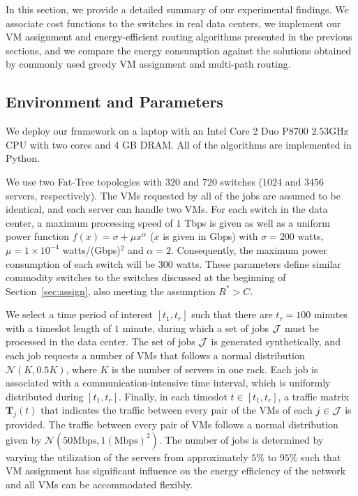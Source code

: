 \documentclass[journal,single-space,two column,twoside,10pt]{IEEEtran}
\begin{document}
In this section, we provide a detailed summary of our experimental findings. We associate cost functions to the switches in real data centers, we implement our VM assignment and \textcolor{black}{energy-efficient} routing algorithms presented in the previous sections, and we compare the energy consumption against the solutions obtained by commonly used greedy VM assignment and multi-path routing.


\subsection{Environment and Parameters}

We deploy our framework on a laptop with an Intel Core 2 Duo P8700 $2.53$GHz CPU with two cores and 4 GB DRAM. All of the algorithms are implemented in Python. 

We use two Fat-Tree topologies with $320$ and $720$ switches ($1024$ and $3456$ servers, respectively). The VMs requested by all of the jobs are assumed to be identical, and each server can handle two VMs. For each switch in the data center, a maximum processing speed of $1$ Tbps is given as well as a uniform power function $f(x) = \sigma + \mu x^{\alpha}$ ($x$ is given in Gbps) with $\sigma = 200$ watts, $\mu = 1 \times 10^{-4}$ watts/(Gbps)$^2$ and $\alpha = 2$. Consequently, the maximum power consumption of each switch will be $300$ watts. These parameters define similar commodity switches to the switches discussed at the beginning of Section~\ref{sec:assign}, also meeting the assumption $R^* > C$.

We select a time period of interest $[t_1,t_r]$ such that there are $t_r=100$ minutes with a timeslot length of $1$ minute, during which a set of jobs $\cal{J}$ must be processed in the data center. The set of jobs $\cal{J}$ is generated synthetically, and each job requests a number of VMs that follows a normal distribution $\mathcal{N}(K, 0.5K)$, where $K$ is the number of servers in one rack. Each job is associated with a communication-intensive time interval, which is uniformly distributed during $[t_1,t_r]$. Finally, in each timeslot $t\in[t_1,t_r]$, a traffic matrix $\mathbf{T}_j(t)$ that indicates the traffic between every pair of the VMs of each $j\in\cal{J}$ is provided. The traffic between every pair of VMs follows a normal distribution given by $\mathcal{N}(50 \text{Mbps}, 1 (\text{Mbps})^2)$. The number of jobs is determined by varying the utilization of the servers from approximately $5\%$ to $95\%$ such that VM assignment has significant influence on the energy efficiency of the network and all VMs can be accommodated flexibly. 
\end{document}
